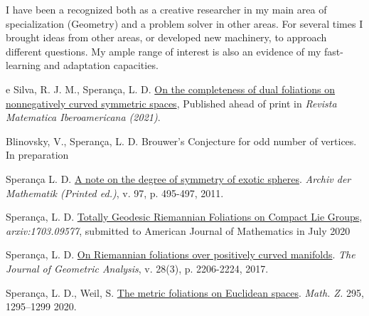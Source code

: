 \documentclass[10pt]{article}
\newenvironment{innerlist}[1][\enskip\textbullet]%
{\begin{compactitem}[#1]}{\end{compactitem}}
\begin{document}
	I have been a recognized both as a creative researcher in my main area of specialization (Geometry) and a problem solver in other areas. For several times I brought ideas from other areas, or developed new machinery, to approach different questions. My ample range of interest is also an evidence of my fast-learning and adaptation capacities.
		\begin{innerlist}[-]
		\item  e Silva, R. J. M., Sperança, L. D. \href{https://ems.press/journals/rmi/articles/1567309}{On the completeness of dual foliations on nonnegatively curved symmetric spaces}, Published ahead of print in \textit{Revista Matematica Iberoamericana (2021)}.


		\item Blinovsky, V., Sperança, L. D.
		Brouwer's Conjecture for odd number of vertices. In preparation


		
					\item Sperança L. D. \href{https://link.springer.com/article/10.1007/s00013-011-0317-3}{A note on the degree of symmetry of exotic spheres}. {\textit{Archiv der Mathematik (Printed ed.)},  v. 97, p. 495-497, 2011}.
		
		
		
		
		\item Sperança, L. D. \href{https://arxiv.org/abs/1703.09577}{Totally Geodesic Riemannian Foliations on Compact Lie Groups}, \textit{{arxiv:1703.09577}}, submitted to  American Journal of Mathematics in July 2020
		
		
		\item Sperança, L. D. \href{https://link.springer.com/article/10.1007/s12220-017-9901-5}{On Riemannian foliations over positively curved manifolds}. {\textit{The Journal of Geometric Analysis}, v. 28(3), p. 2206-2224, 2017}.
		
		\item Sperança, L. D., Weil, S.  \href{https://link.springer.com/article/10.1007/s00209-019-02425-3}{The metric foliations on Euclidean spaces}. \textit{Math. Z.} 295, 1295–1299 2020.
		
		

\end{innerlist}
	
	
	
	
	
	
	
\end{document}

